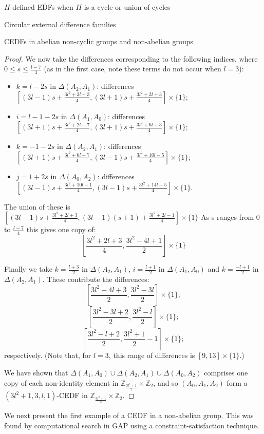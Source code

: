 \documentclass[12pt, a4paper]{article}
\theoremstyle{definition}
\begin{document}
\begin{section}{$H$-defined EDFs when $H$ is a cycle or union of cycles}
\begin{subsection}{Circular external difference families}
\begin{subsection}{CEDFs in abelian non-cyclic groups and non-abelian groups}
\begin{proof}
We now take the differences corresponding to the following indices, where $0 \leq s \leq \frac{l-7}{4}$ (as in the first case, note these terms do not occur when $l=3$):
\begin{itemize}
    \item $k=l-2s$ in $\Delta(A_2,A_1)$: differences $[(3l-1)s+\frac{3l^2+2l+3}{4},(3l+1)s+\frac{3l^2+2l+3}{4}]\times\{1\};$
    \item $i=l-1-2s$ in $\Delta(A_1,A_0)$: differences $[(3l+1)s+\frac{3l^2+2l+7}{4},(3l+1)s+\frac{3l^2+6l+3}{4}]\times\{1\};$
    \item $k=-1-2s$ in $\Delta(A_2,A_1)$: differences $[(3l+1)s+\frac{3l^2+6l+7}{4},(3l-1)s+\frac{3l^2+10l-5}{4}]\times\{1\};$
    \item $j=1+2s$ in $\Delta(A_0,A_2)$: differences $[(3l-1)s+\frac{3l^2+10l-1}{4},(3l-1)s+\frac{3l^2+14l-5}{4}]\times\{1\}.$
\end{itemize}
The union of these is $[(3l-1)s+\frac{3l^2+2l+3}{4},(3l-1)(s+1)+\frac{3l^2+2l-1}{4}]\times\{1\}$
As s ranges from $0$ to $\frac{l-7}{4}$ this gives one copy of:
\[[\frac{3l^2+2l+3}{4},\frac{3l^2-4l+1}{2}]\times\{1\}\]

Finally we take $k=\frac{l+3}{2}$ in $\Delta(A_2,A_1)$, $i = \frac{l+1}{2}$ in $\Delta(A_1,A_0)$ and $k=\frac{-l+1}{2}$ in $\Delta(A_2,A_1)$.  These contribute the differences:
\[[\frac{3l^2-4l+3}{2},\frac{3l^2-3l}{2}]\times\{1\};\]
\[[\frac{3l^2-3l+2}{2},\frac{3l^2-l}{2}]\times\{1\};\]
\[[\frac{3l^2-l+2}{2},\frac{3l^2+1}{2}-1]\times\{1\};\]
respectively.  (Note that, for $l=3$, this range of differences is $[9,13]\times\{1\}$.)

We have shown that $\Delta(A_1,A_0) \cup \Delta(A_2,A_1) \cup \Delta(A_0,A_2)$ comprises one copy of each non-identity element in $\mathbb{Z}_{\frac{3l^2+1}{2}}\times\mathbb{Z}_2$, and so $(A_0,A_1,A_2)$ form a $(3l^2+1,3,l,1)$-CEDF in $\mathbb{Z}_{\frac{3l^2+1}{2}}\times\mathbb{Z}_2.$
\end{proof}



We next present the first example of a CEDF in a non-abelian group.  This was found by computational search in GAP \cite{GAP} using a constraint-satisfaction technique.


\end{subsection}
\end{subsection}
\end{section}
\end{document}
